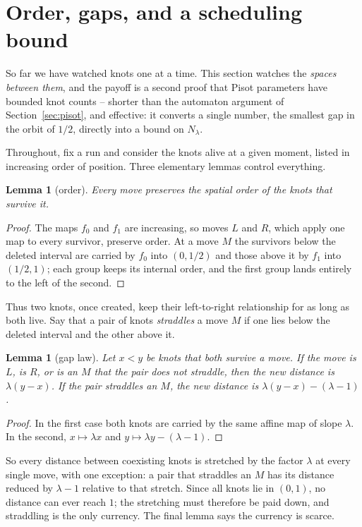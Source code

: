 \documentclass[11pt,reqno]{amsart}
\theoremstyle{plain}
\newtheorem{lemma}[theorem]{Lemma}
\theoremstyle{definition}
\theoremstyle{remark}
\begin{document}
\section{Order, gaps, and a scheduling bound}\label{sec:gaps}

So far we have watched knots one at a time. This section watches the
\emph{spaces between them}, and the payoff is a second proof that Pisot
parameters have bounded knot counts -- shorter than the automaton argument of
Section~\ref{sec:pisot}, and effective: it converts a single number, the
smallest gap in the orbit of $1/2$, directly into a bound on
$N_\lambda$.

Throughout, fix a run and consider the knots alive at a given moment, listed in
increasing order of position. Three elementary lemmas control everything.

\begin{lemma}[order]\label{lem:order}
Every move preserves the spatial order of the knots that survive it.
\end{lemma}

\begin{proof}
The maps $f_0$ and $f_1$ are increasing, so moves $L$ and $R$, which apply one
map to every survivor, preserve order. At a move $M$ the survivors below the
deleted interval are carried by $f_0$ into $(0,1/2)$ and those above it by
$f_1$ into $(1/2,1)$; each group keeps its internal order, and the first group
lands entirely to the left of the second.
\end{proof}

Thus two knots, once created, keep their left-to-right relationship for as long
as both live. Say that a pair of knots \emph{straddles} a move $M$ if one lies
below the deleted interval and the other above it.

\begin{lemma}[gap law]\label{lem:gaplaw}
Let $x<y$ be knots that both survive a move. If the move is $L$, is $R$, or is
an $M$ that the pair does not straddle, then the new distance is
$\lambda(y-x)$. If the pair straddles an $M$, the new distance is
$\lambda(y-x)-(\lambda-1)$.
\end{lemma}

\begin{proof}
In the first case both knots are carried by the same affine map of slope
$\lambda$. In the second, $x\mapsto\lambda x$ and
$y\mapsto\lambda y-(\lambda-1)$.
\end{proof}

So every distance between coexisting knots is stretched by the factor
$\lambda$ at every single move, with one exception: a pair that straddles an
$M$ has its distance reduced by $\lambda-1$ relative to that stretch. Since
all knots lie in $(0,1)$, no distance can ever reach $1$; the stretching must
therefore be paid down, and straddling is the only currency. The final lemma
says the currency is scarce.
\end{document}
